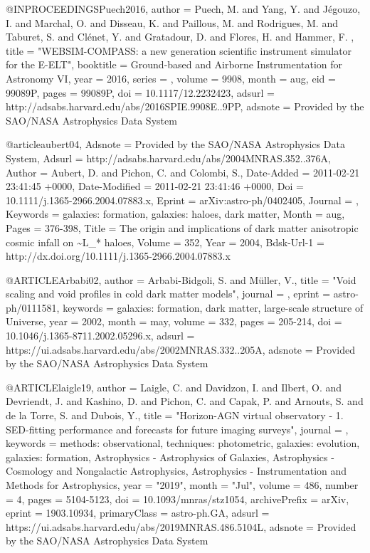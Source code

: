 \documentclass{aa}
\begin{document}

@INPROCEEDINGS{Puech2016,
   author = {{Puech}, M. and {Yang}, Y. and {J{\'e}gouzo}, I. and {Marchal}, O. and 
	{Disseau}, K. and {Paillous}, M. and {Rodrigues}, M. and {Taburet}, S. and 
	{Cl{\'e}net}, Y. and {Gratadour}, D. and {Flores}, H. and {Hammer}, F.
	},
    title = "{WEBSIM-COMPASS: a new generation scientific instrument simulator for the E-ELT}",
booktitle = {Ground-based and Airborne Instrumentation for Astronomy VI},
     year = 2016,
   series = {\procspie},
   volume = 9908,
    month = aug,
      eid = {99089P},
    pages = {99089P},
      doi = {10.1117/12.2232423},
   adsurl = {http://adsabs.harvard.edu/abs/2016SPIE.9908E..9PP},
  adsnote = {Provided by the SAO/NASA Astrophysics Data System}
}

@article{aubert04,
	Adsnote = {Provided by the SAO/NASA Astrophysics Data System},
	Adsurl = {http://adsabs.harvard.edu/abs/2004MNRAS.352..376A},
	Author = {{Aubert}, D. and {Pichon}, C. and {Colombi}, S.},
	Date-Added = {2011-02-21 23:41:45 +0000},
	Date-Modified = {2011-02-21 23:41:46 +0000},
	Doi = {10.1111/j.1365-2966.2004.07883.x},
	Eprint = {arXiv:astro-ph/0402405},
	Journal = {\mnras},
	Keywords = {galaxies: formation, galaxies: haloes, dark matter},
	Month = aug,
	Pages = {376-398},
	Title = {{The origin and implications of dark matter anisotropic cosmic infall on \~{}L_{*} haloes}},
	Volume = 352,
	Year = 2004,
	Bdsk-Url-1 = {http://dx.doi.org/10.1111/j.1365-2966.2004.07883.x}}

@ARTICLE{Arbabi02,
   author = {{Arbabi-Bidgoli}, S. and {M{\"u}ller}, V.},
    title = "{Void scaling and void profiles in cold dark matter models}",
  journal = {\mnras},
   eprint = {astro-ph/0111581},
 keywords = {galaxies: formation, dark matter, large-scale structure of Universe},
     year = 2002,
    month = may,
   volume = 332,
    pages = {205-214},
      doi = {10.1046/j.1365-8711.2002.05296.x},
   adsurl = {https://ui.adsabs.harvard.edu/abs/2002MNRAS.332..205A},
  adsnote = {Provided by the SAO/NASA Astrophysics Data System}
}

@ARTICLE{laigle19,
       author = {{Laigle}, C. and {Davidzon}, I. and {Ilbert}, O. and {Devriendt}, J. and
         {Kashino}, D. and {Pichon}, C. and {Capak}, P. and {Arnouts}, S. and
         {de la Torre}, S. and {Dubois}, Y.},
        title = "{Horizon-AGN virtual observatory - 1. SED-fitting performance and forecasts for future imaging surveys}",
      journal = {\mnras},
     keywords = {methods: observational, techniques: photometric, galaxies: evolution, galaxies: formation, Astrophysics - Astrophysics of Galaxies, Astrophysics - Cosmology and Nongalactic Astrophysics, Astrophysics - Instrumentation and Methods for Astrophysics},
         year = "2019",
        month = "Jul",
       volume = {486},
       number = {4},
        pages = {5104-5123},
          doi = {10.1093/mnras/stz1054},
archivePrefix = {arXiv},
       eprint = {1903.10934},
 primaryClass = {astro-ph.GA},
       adsurl = {https://ui.adsabs.harvard.edu/abs/2019MNRAS.486.5104L},
      adsnote = {Provided by the SAO/NASA Astrophysics Data System}
}
\end{document}
